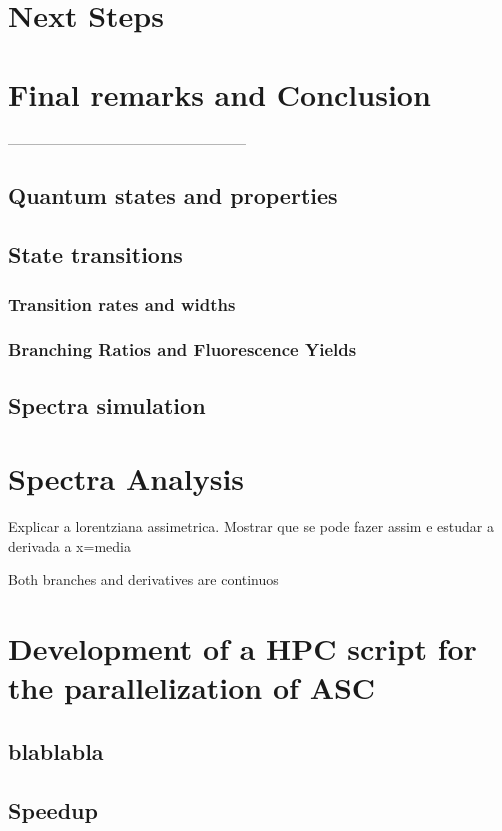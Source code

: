 \chapter{Next Steps}
\chapter{Final remarks and Conclusion}
---------------------------------------------------


\section{Quantum states and properties}

\section{State transitions}

\subsection{Transition rates and widths}
\subsection{Branching Ratios and Fluorescence Yields}

\section{Spectra simulation}

\chapter{Spectra Analysis}


Explicar a lorentziana assimetrica. Mostrar que se pode fazer assim e estudar a derivada a x=media

Both branches and derivatives are continuos

\chapter{Development of a \gls{HPC} script for the parallelization of \gls{ASC}}

\section{blablabla}

\section{Speedup}

